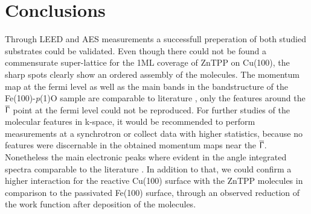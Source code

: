 \chapter{Conclusions}

Through LEED and AES measurements a successfull preperation of both studied substrates could be validated.
Even though there could not be found a commensurate super-lattice for the 1ML coverage of ZnTPP on Cu(100), the sharp spots clearly show an ordered assembly of the molecules.
The momentum map at the fermi level as well as the main bands in the bandstructure of the Fe(100)-\textit{p}(1)O sample are comparable to literature \cite*{janas_enhancing_2022}, only the features around the $\overline{\Upgamma}$ point at the fermi level could not be reproduced.
For further studies of the molecular features in k-space, it would be recommended to perform measurements at a synchrotron or collect data with higher statistics, because no features were discernable in the obtained momentum maps near the $\overline{\Upgamma}$.
Nonetheless the main electronic peaks where evident in the angle integrated spectra comparable to the literature \cite*{tesi}.
In addition to that, we could confirm a higher interaction for the reactive Cu(100) surface with the ZnTPP molecules in comparison to the passivated Fe(100) surface, through an observed reduction of the work function after deposition of the molecules.